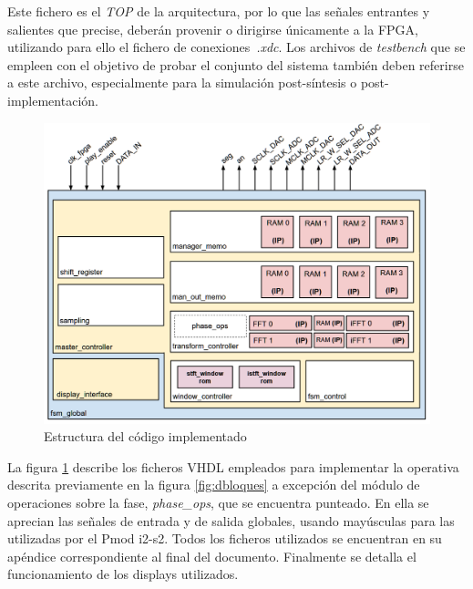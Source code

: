 Este fichero es el \emph{TOP} de la arquitectura, por lo que las señales entrantes y salientes que precise, deberán provenir o dirigirse únicamente a la FPGA, utilizando para ello el fichero de conexiones~\emph{.xdc}. Los archivos de \emph{testbench} que se empleen con el objetivo de probar el conjunto del sistema también deben referirse a este archivo, especialmente para la simulación post-síntesis o post-implementación. 

\begin{figure}[!ht]
\begin{center}
\includegraphics[width=15cm]{img/bloquesImp.png}
\caption{\label{fig:bimp}Estructura del código implementado}
\end{center}
\end{figure}

La figura \ref{fig:bimp} describe los ficheros VHDL empleados para implementar la operativa descrita previamente en la figura \ref{fig:dbloques} a excepción del módulo de operaciones sobre la fase, \emph{phase\_ops}, que se encuentra punteado. En ella se aprecian las señales de entrada y de salida globales, usando mayúsculas para las utilizadas por el Pmod i2-s2. Todos los ficheros utilizados se encuentran en su apéndice correspondiente al final del documento. Finalmente se detalla el funcionamiento de los displays utilizados.


